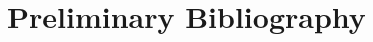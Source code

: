 \documentclass{article}
\begin{document}
%
\section{Preliminary Bibliography}
\setlength{\parskip}{-.15in} 

\renewcommand{\refname}{} %

\nocite{mm2} %



%
\end{document}
